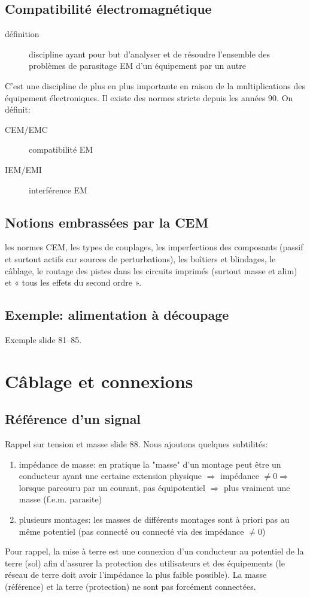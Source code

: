 \subsection{Compatibilité électromagnétique}
\begin{description}
	\item[définition] discipline ayant pour but d'analyser et de résoudre l'ensemble des problèmes de parasitage EM d'un équipement par un autre
\end{description}
C'est une discipline de plus en plus importante en raison de la multiplications des équipement électroniques. Il existe des normes stricte depuis les années 90. On définit:
\begin{description}
	\item[CEM/EMC] compatibilité EM
	\item[IEM/EMI] interférence EM
\end{description}
\subsection{Notions embrassées par la CEM}
les normes CEM, les types de couplages, les imperfections des composants (passif et surtout actifs car sources de perturbations), les boîtiers et blindages, le câblage, le routage des pistes dans les circuits imprimés (surtout masse et alim) et « tous les effets du second ordre ».
\subsection{Exemple: alimentation à découpage}
Exemple slide 81--85.
\section{Câblage et connexions}
\subsection{Référence d'un signal}
Rappel sur tension et masse slide 88. Nous ajoutons quelques subtilités:
\begin{enumerate}
	\item impédance de masse: en pratique la "masse" d'un montage peut être un conducteur ayant une certaine extension physique \(\Rightarrow\) impédance \(\neq 0 \Rightarrow\) lorsque parcouru par un courant, pas équipotentiel \(\Rightarrow\) plus vraiment une masse (f.e.m. parasite)
	\item plusieurs montages: les masses de différents montages sont à priori pas au même potentiel (pas connecté ou connecté via des impédance \(\neq 0\))
\end{enumerate}
Pour rappel, la mise à terre est une connexion d'un conducteur au potentiel de la terre (sol) afin d'assurer la protection des utilisateurs et des équipements (le réseau de terre doit avoir l'impédance la plus faible possible). La masse (référence) et la terre (protection) ne sont pas forcément connectées.\\

